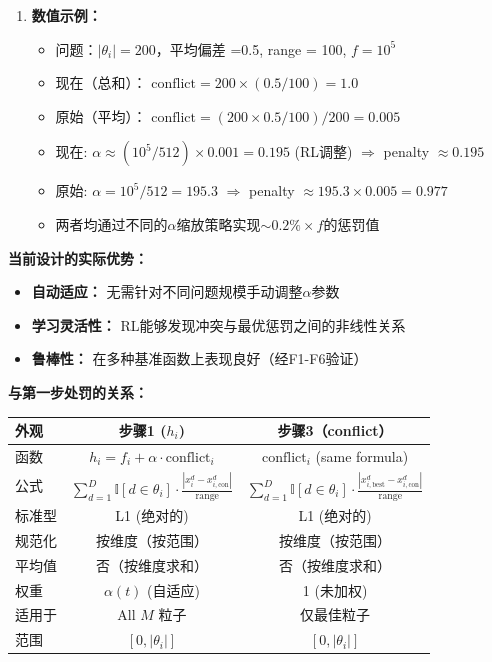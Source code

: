 \documentclass[11pt,a3paper]{ctexart}
\begin{document}
\begin{enumerate}
    \item \textbf{数值示例：}
    \begin{itemize}
        \item 问题：$|\theta_i| = 200$，平均偏差 =0.5, range = 100, $f = 10^5$
        \item 现在（总和）： $\text{conflict} = 200 \times (0.5/100) = 1.0$
        \item 原始（平均）： $\text{conflict} = (200 \times 0.5/100) / 200 = 0.005$
        \item 现在: $\alpha \approx (10^5 / 512) \times 0.001 = 0.195$ (RL调整) $\Rightarrow$ penalty $\approx 0.195$
        \item 原始: $\alpha = 10^5 / 512 = 195.3$ $\Rightarrow$ penalty $\approx 195.3 \times 0.005 = 0.977$
        \item 两者均通过不同的$\alpha$缩放策略实现$\sim 0.2\% \times f$的惩罚值
    \end{itemize}
\end{enumerate}

\textbf{当前设计的实际优势：}
\begin{itemize}
    \item \textbf{自动适应：} 无需针对不同问题规模手动调整$\alpha$参数
    \item \textbf{学习灵活性：} RL能够发现冲突与最优惩罚之间的非线性关系
    \item \textbf{鲁棒性：} 在多种基准函数上表现良好（经F1-F6验证）
\end{itemize}

\textbf{与第一步处罚的关系：}
\begin{center}
\begin{tabular}{|l|c|c|}
\hline
\textbf{外观} & \textbf{步骤1 ($h_i$)} & \textbf{步骤3（conflict）} \\
\hline
函数 & $h_i = f_i + \alpha \cdot \text{conflict}_i$ & $\text{conflict}_i$ (same formula) \\
公式 & $\sum_{d=1}^D \mathbb{I}[d \in \theta_i] \cdot \frac{|x_i^d - x_{i,\text{con}}^d|}{\text{range}}$ & $\sum_{d=1}^D \mathbb{I}[d \in \theta_i] \cdot \frac{|x_{i,\text{best}}^d - x_{i,\text{con}}^d|}{\text{range}}$ \\
标准型 & L1 (绝对的) & L1 (绝对的) \\
规范化 & 按维度（按范围） & 按维度（按范围） \\
平均值 & 否（按维度求和） & 否（按维度求和） \\
权重 & $\alpha(t)$ (自适应) & 1 (未加权) \\
适用于 & All $M$ 粒子 & 仅最佳粒子 \\
范围 & $[0, |\theta_i|]$ & $[0, |\theta_i|]$ \\
\hline
\end{tabular}
\end{center}
\end{document}
